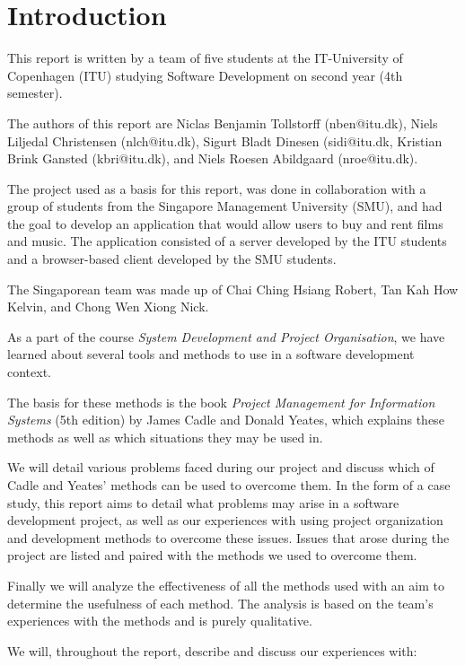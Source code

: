 \section{Introduction}

This report is written by a team of five students at the IT-University of Copenhagen (ITU)
studying Software Development on second year (4th semester).

The authors of this report are Niclas Benjamin Tollstorff (nben@itu.dk), Niels Liljedal
Christensen (nlch@itu.dk), Sigurt Bladt Dinesen (sidi@itu.dk, Kristian Brink Gansted
(kbri@itu.dk), and Niels Roesen Abildgaard (nroe@itu.dk).

The project used as a basis for this report, was done in collaboration with a group of
students from the Singapore Management University (SMU), and had the goal to develop an
application that would allow users to buy and rent films and music. The application consisted
of a server developed by the ITU students and a browser-based client developed by the SMU
students.

The Singaporean team was made up of Chai Ching Hsiang Robert, Tan Kah How Kelvin, and
Chong Wen Xiong Nick.

As a part of the course \emph{System Development and Project Organisation}, we have learned
about several tools and methods to use in a software development context.

The basis for these methods is the book \emph{Project Management for Information Systems}
(5th edition) by James Cadle and Donald Yeates, which explains these methods as well
as which situations they may be used in.

We will detail various problems faced during our project and discuss which of Cadle and
Yeates' methods can be used to overcome them. In the form of a case study, this report
aims to detail what problems may arise in a software development project, as well as our
experiences with using project organization and development methods to overcome these
issues. Issues that arose during the project are listed and paired with the methods we
used to overcome them.

Finally we will analyze the effectiveness of all the methods used with an aim to determine
the usefulness of each method. The analysis is based on the team’s experiences with the
methods and is purely qualitative.

We will, throughout the report, describe and discuss our experiences with:

